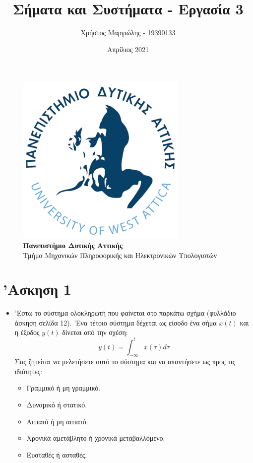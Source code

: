 \documentclass{article}
\title{Σήματα και Συστήματα - Εργασία 3}
\author{Χρήστος Μαργιώλης - 19390133}
\date{Απρίλιος 2021}
\begin{document}
\begin{titlepage}
	\maketitle
	\begin{figure}[t!]
	\begin{center}
	\includegraphics[scale=0.3]{./res/uniwalogo.png} \\
	\Large
	\textbf{Πανεπιστήμιο Δυτικής Αττικής} \\
	\large
	Τμήμα Μηχανικών Πληροφορικής και Ηλεκτρονικών Υπολογιστών
	\end{center}
	\end{figure}
\end{titlepage}

\renewcommand{\contentsname}{Περιεχόμενα}
\tableofcontents

\section{'Ασκηση 1}

\begin{itemize}
	\item 'Εστω το σύστημα ολοκληρωτή που φαίνεται στο παρκάτω
		σχήμα (φυλλάδιο άσκηση σελίδα 12). 'Ενα τέτοιο
		σύστημα δέχεται ως είσοδο ένα σήμα $x(t)$ και η έξοδος
		$y(t)$ δίνεται από την σχέση:
		\[y(t) = \int_{-\infty}^{t} x(τ)dτ\]
		Σας ζητείται να μελετήσετε αυτό το σύστημα και να
		απαντήσετε ως προς τις ιδιότητες:
		\begin{itemize}
			\item Γραμμικό ή μη γραμμικό.
			\item Δυναμικό ή στατικό.
			\item Αιτιατό ή μη αιτιατό.
			\item Χρονικά αμετάβλητο ή χρονικά μεταβαλλόμενο.
			\item Ευσταθές ή ασταθές.
		\end{itemize}
\end{itemize}
\end{document}
